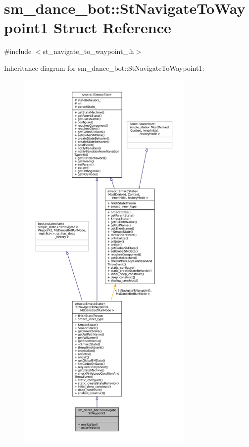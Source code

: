 \hypertarget{structsm__dance__bot_1_1StNavigateToWaypoint1}{}\section{sm\+\_\+dance\+\_\+bot\+:\+:St\+Navigate\+To\+Waypoint1 Struct Reference}
\label{structsm__dance__bot_1_1StNavigateToWaypoint1}


{\ttfamily \#include $<$st\+\_\+navigate\+\_\+to\+\_\+waypoint\+\_.\+h$>$}



Inheritance diagram for sm\+\_\+dance\+\_\+bot\+:\+:St\+Navigate\+To\+Waypoint1\+:
\nopagebreak
\begin{figure}[H]
\begin{center}
\leavevmode
\includegraphics[height=550pt]{structsm__dance__bot_1_1StNavigateToWaypoint1__inherit__graph}
\end{center}
\end{figure}


